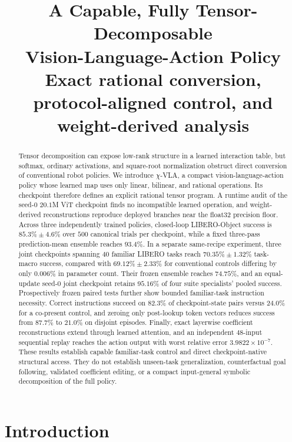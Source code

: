 \documentclass{article}
\title{\textbf{A Capable, Fully Tensor-Decomposable}\\[0.15em]
\textbf{Vision-Language-Action Policy}\\[0.35em]
\large Exact rational conversion, protocol-aligned control, and weight-derived analysis}
\author{}
\date{}
\newcommand{\chivla}{$\chi$-VLA}
\begin{document}
\maketitle

\begin{abstract}
Tensor decomposition can expose low-rank structure in a learned interaction table, but softmax,
ordinary activations, and square-root normalization obstruct direct conversion of conventional
robot policies. We introduce \chivla, a compact vision-language-action policy whose learned map
uses only linear, bilinear, and rational operations. Its checkpoint therefore defines an explicit
rational tensor program. A runtime audit of the seed-$0$ $20.1$M ViT checkpoint finds no
incompatible learned operation, and weight-derived reconstructions reproduce deployed branches
near the float32 precision floor. Across three independently trained policies, closed-loop
LIBERO-Object success is $85.3\%\pm4.6\%$ over $500$ canonical trials per checkpoint, while a
fixed three-pass prediction-mean ensemble reaches $93.4\%$. In a separate same-recipe experiment,
three joint checkpoints spanning $40$ familiar LIBERO tasks reach $70.35\%\pm1.32\%$ task-macro
success, compared with $69.12\%\pm2.33\%$ for conventional controls differing by only $0.006\%$
in parameter count. Their frozen ensemble reaches $74.75\%$, and an equal-update seed-$0$ joint
checkpoint retains $95.16\%$ of four suite specialists' pooled success. Prospectively frozen
paired tests further show bounded familiar-task instruction necessity. Correct instructions
succeed on $82.3\%$ of checkpoint-state pairs versus $24.0\%$ for a co-present control, and
zeroing only post-lookup token vectors reduces success from $87.7\%$ to $21.0\%$ on disjoint
episodes. Finally, exact layerwise coefficient reconstructions extend through learned attention,
and an independent $48$-input sequential replay reaches the action output with worst relative
error $3.9822\times10^{-7}$. These results establish capable familiar-task control and direct
checkpoint-native structural access. They do not establish unseen-task generalization,
counterfactual goal following, validated coefficient editing, or a compact input-general symbolic
decomposition of the full policy.
\end{abstract}

\section{Introduction}
\end{document}
